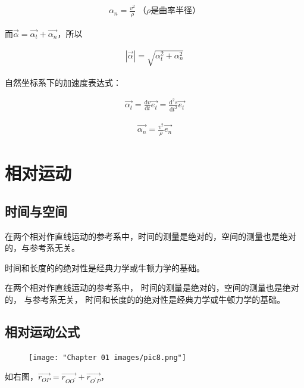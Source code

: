 \documentclass[
	12pt, %
	a4paper, %
]{myLegrandOrangeBook}
\newcommand{\rmd}{\mathrm{d}}
\newcommand{\deriv}[2]{\frac{\rmd #1}{\rmd #2}}
\begin{document}
    \begin{align}
        \alpha_n = \frac{v^2}{\rho}\; \text{（\(\rho\)是曲率半径）}
    \end{align}

    而\(\overrightarrow{\alpha} = \overrightarrow{\alpha_t} + \overrightarrow{\alpha_n}\)，所以

    \begin{align}
        \left|\overrightarrow{\alpha}\right| = \sqrt{\alpha_t^2 + \alpha_n^2}
    \end{align}

    自然坐标系下的加速度表达式：
    
    \begin{align}
        \overrightarrow{\alpha_t} = \deriv{v}{t} \overrightarrow{e_t} =
        \frac{\rmd^2 s}{\rmd t^2} \overrightarrow{e_t}
    \end{align}

    \begin{align}
        \overrightarrow{\alpha_n} = \frac{v^2}{\rho} \overrightarrow{e_n}
    \end{align}

\section{相对运动}

\subsection{时间与空间}

    在两个相对作直线运动的参考系中，时间的测量是绝对的，空间的测量也是绝对的，与参考系无关。

    时间和长度的的绝对性是经典力学或牛顿力学的基础。

    在两个相对作直线运动的参考系中， 时间的测量是绝对的，空间的测量也是绝对的， 与参考系无关， 时间和长度的的绝对性是经典力学或牛顿力学的基础。

\subsection{相对运动公式}

    \begin{figure}
        \centering
        \texttt{[image: "Chapter 01 images/pic8.png"]}
        \label{pic8}
    \end{figure}

    如右图，\(\overrightarrow{r_{OP}} = \overrightarrow{r_{OO^{'}}} + \overrightarrow{r_{O^{'}P}}\)，
\end{document}
